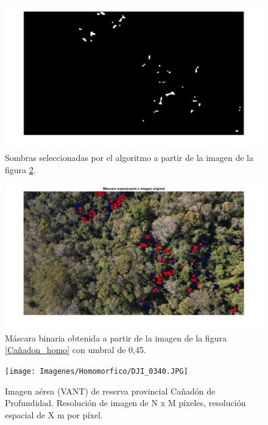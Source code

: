 \begin{figure}[h!]
    \includegraphics[width=\textwidth]{Imagenes/Homomorfico/DJI_240_sel.png}
     \hfill
     \caption{Sombras seleccionadas por el algoritmo a partir de la imagen de la figura \ref{mascaraCañadon}.}
    \label{seleccionadaDJI240}
\end{figure}

\begin{figure}[h!]
    \includegraphics[width=\textwidth]{Imagenes/Homomorfico/dji_240_seleccionadas.png}
     \hfill
     \caption{Máscara binaria obtenida a partir de la imagen de la figura \ref{Cañadon_homo} con umbral de 0,45.}
    \label{mascaraCañadon}
\end{figure}

\begin{figure}[h!]
    \texttt{[image: Imagenes/Homomorfico/DJI\_0340.JPG]}
     \hfill
     \caption{Imagen aérea (VANT) de reserva provincial Cañadón de Profundidad. Resolución de imagen de N x M píxeles, resolución espacial de X m por píxel.}
    \label{Cañadon_homo2}
\end{figure}

